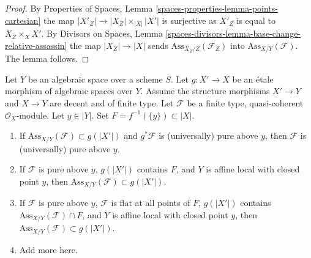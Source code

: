 \begin{proof}
By Properties of Spaces, Lemma \ref{spaces-properties-lemma-points-cartesian}
the map $|X'_Z| \to |X_Z| \times_{|X|} |X'|$ is surjective as
$X'_Z$ is equal to $X_Z \times_X X'$.
By Divisors on Spaces, Lemma
\ref{spaces-divisors-lemma-base-change-relative-assassin}
the map $|X_Z| \to |X|$ sends $\text{Ass}_{X_Z/Z}(\mathcal{F}_Z)$
into $\text{Ass}_{X/Y}(\mathcal{F})$. The lemma follows.
\end{proof}

\begin{lemma}
\label{lemma-pure-on-top}
Let $Y$ be an algebraic space over a scheme $S$. Let $g : X' \to X$ be an
\'etale morphism of algebraic spaces over $Y$. Assume the structure
morphisms $X' \to Y$ and $X \to Y$ are decent and of finite type.
Let $\mathcal{F}$ be a finite type, quasi-coherent $\mathcal{O}_X$-module.
Let $y \in |Y|$. Set $F = f^{-1}(\{y\}) \subset |X|$.
\begin{enumerate}
\item If $\text{Ass}_{X/Y}(\mathcal{F}) \subset g(|X'|)$
and $g^*\mathcal{F}$ is (universally) pure above $y$, then
$\mathcal{F}$ is (universally) pure above $y$.
\item If $\mathcal{F}$ is pure above $y$, $g(|X'|)$ contains $F$, and
$Y$ is affine local with closed point $y$, then
$\text{Ass}_{X/Y}(\mathcal{F}) \subset g(|X'|)$.
\item If $\mathcal{F}$ is pure above $y$, $\mathcal{F}$ is flat
at all points of $F$, $g(|X'|)$ contains
$\text{Ass}_{X/Y}(\mathcal{F}) \cap F$, and $Y$ is affine local
with closed point $y$, then
$\text{Ass}_{X/Y}(\mathcal{F}) \subset g(|X'|)$.
\item Add more here.
\end{enumerate}
\end{lemma}

